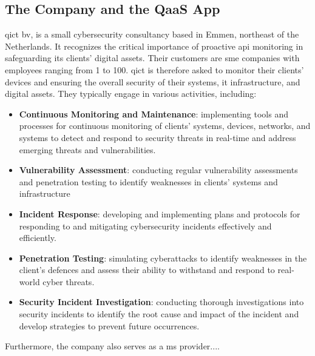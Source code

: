 \begin{multicols}{2}
      \section{The Company and the QaaS App}
      \acrshort{qict} \acrshort{bv}, is a small cybersecurity consultancy based in Emmen, northeast of the
      Netherlands. It recognizes the critical importance of proactive \acrshort{api} monitoring in safeguarding
      its clients' digital assets. Their customers are \acrshort{sme} companies with employees ranging from 1 to 100.
      \acrshort{qict} is therefore asked to monitor their clients' devices and ensuring the overall security of
      their systems, \acrshort{it} infrastructure, and digital assets. They typically engage in various activities,
      including:
      \begin{itemize}
            \item \textbf{Continuous Monitoring and Maintenance}: implementing tools and processes for continuous
                  monitoring of clients' systems, devices, networks, and systems to detect and respond to security
                  threats in real-time and address emerging threats and vulnerabilities.
            \item \textbf{Vulnerability Assessment}: conducting regular vulnerability assessments and penetration
                  testing to identify weaknesses in clients' systems and infrastructure
            \item \textbf{Incident Response}: developing and implementing plans and protocols for responding to
                  and mitigating cybersecurity incidents effectively and efficiently.
            \item \textbf{Penetration Testing}: simulating cyberattacks to identify weaknesses in the client's
                  defences and assess their ability to withstand and respond to real-world cyber threats.
            \item \textbf{Security Incident Investigation}: conducting thorough investigations into security
                  incidents to identify the root cause and impact of the incident and develop strategies to prevent
                  future occurrences.
      \end{itemize}
      Furthermore, the company also serves as a \acrshort{ms} provider....

\end{multicols}
